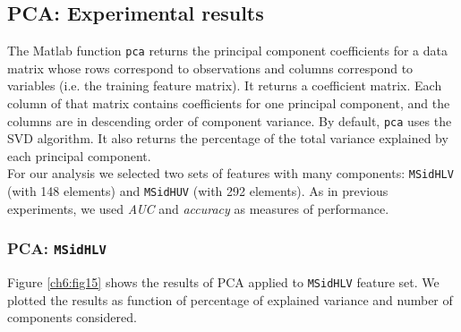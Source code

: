 \subsection{PCA: Experimental results}

The Matlab function \texttt{pca} returns the principal component coefficients for a data matrix whose rows correspond to observations and columns correspond to variables (i.e. the training feature matrix).
It returns a coefficient matrix. Each column of that matrix contains coefficients for one principal component, and the columns are in descending order of component variance.
By default, \texttt{pca} uses the \Gls{SVD} algorithm. It also returns the percentage of the total variance explained by each principal component.\\
For our analysis we selected two sets of features with many components: \texttt{MSidHLV} (with 148 elements) and \texttt{MSidHUV} (with 292 elements). As in previous experiments,
we used \textit{AUC} and \textit{accuracy} as measures of performance.

\vspace{0.5cm}

\subsubsection{PCA: \texttt{MSidHLV}}

Figure \ref{ch6:fig15} shows the results of \Gls{PCA} applied to \texttt{MSidHLV} feature set. We plotted the results as function of percentage of
explained variance and number of components considered.

